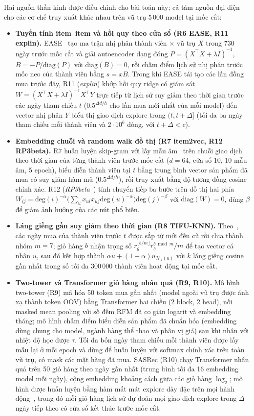 \documentclass[jtehm]{ieeeaccess}
\begin{document}
Hai nguồn thần kinh được điều chỉnh cho bài toán này; cả tám nguồn đại diện cho các cơ chế truy xuất khác nhau trên vũ trụ 5\,000 model tại mốc cắt:
\begin{itemize}
\item \textbf{Tuyến tính item--item và hồi quy theo cửa sổ (R6 EASE, R11 explin).} EASE~\cite{steck2019ease} tạo ma trận nhị phân thành viên $\times$ vũ trụ $X$ trong 730 ngày trước mốc cắt và giải autoencoder dạng đóng $P = (X^\top X + \lambda I)^{-1}$, $B = -P / \mathrm{diag}(P)$ với $\mathrm{diag}(B) = 0$, rồi chấm điểm lịch sử nhị phân trước mốc neo của thành viên bằng $s = xB$. Trong khi EASE tái tạo các lần đồng mua trước đây, R11 (\emph{explin}) khớp hồi quy ridge có giám sát $W = (X^\top X + \lambda I)^{-1} X^\top Y$ trực tiếp từ lịch sử suy giảm theo thời gian trước các ngày tham chiếu $t$ ($0.5^{\Delta d / h}$ cho lần mua mới nhất của mỗi model) đến vector nhị phân $Y$ biểu thị giao dịch explore trong $(t, t+\Delta]$ (tối đa ba ngày tham chiếu mỗi thành viên và $2\cdot 10^6$ dòng, với $t+\Delta < c$).
\item \textbf{Embedding chuỗi và random walk đồ thị (R7 item2vec, R12 RP3beta).} R7 huấn luyện skip-gram với lấy mẫu âm~\cite{barkan2016item2vec} trên chuỗi giao dịch theo thời gian của từng thành viên trước mốc cắt ($d=64$, cửa sổ 10, 10 mẫu âm, 5 epoch), biểu diễn thành viên tại $t$ bằng trung bình vector sản phẩm đã mua có suy giảm hàm mũ ($0.5^{\Delta d / h}$), rồi truy xuất bằng độ tương đồng cosine chính xác. R12 (\emph{RP3beta}~\cite{paudel2017rp3beta}) tính chuyển tiếp ba bước trên đồ thị hai phía $W_{ij} = \mathrm{deg}(i)^{-\alpha}\bigl(\sum_u x_{ui}x_{uj}\mathrm{deg}(u)^{-\alpha}\bigr)\mathrm{deg}(j)^{-\beta}$ với $\mathrm{diag}(W)=0$, dùng $\beta$ để giảm ảnh hưởng của các nút phổ biến.
\item \textbf{Láng giềng gần suy giảm theo thời gian (R8 TIFU-KNN).} Theo~\cite{hu2020tifu}, các ngày mua của thành viên trước $t$ được sắp từ mới đến cũ rồi chia thành nhóm $m=7$; giỏ hàng $b$ nhận trọng số $r_g^{\lfloor b/m \rfloor} r_b^{b \bmod m} / m$ để tạo vector cá nhân $u$, sau đó kết hợp thành $\alpha u + (1-\alpha)\bar{u}_{\mathcal{N}_k(u)}$ với $k$ láng giềng cosine gần nhất trong số tối đa 300\,000 thành viên hoạt động tại mốc cắt.
\item \textbf{Two-tower và Transformer giỏ hàng nhân quả (R9, R10).} Mô hình two-tower (R9) mã hóa 50 token mua gần nhất (model ngoài vũ trụ được ánh xạ thành token OOV) bằng Transformer hai chiều (2 block, 2 head), nối masked mean pooling với số đếm RFM đã co giãn logarit và embedding tháng; mô hình chấm điểm biểu diễn sản phẩm đã chuẩn hóa (embedding dùng chung cho model, ngành hàng thể thao và phân vị giá) sau khi nhân với nhiệt độ học được $\tau$. Tối đa bốn ngày tham chiếu mỗi thành viên được lấy mẫu lại ở mỗi epoch và dùng để huấn luyện với softmax chính xác trên toàn vũ trụ, có mask các mặt hàng đã mua. SASRec (R10) chạy Transformer nhân quả trên 50 giỏ hàng theo ngày gần nhất (trung bình tối đa 16 embedding model mỗi ngày), cộng embedding khoảng cách giữa các giỏ hàng $\log_2$; mô hình được huấn luyện bằng hàm mất mát explore dày đặc trên mọi hành động~\cite{pancha2022pinnerformer}, trong đó mỗi giỏ hàng lịch sử dự đoán mọi giao dịch explore trong $\Delta$ ngày tiếp theo có cửa sổ kết thúc trước mốc cắt.

\end{itemize}
\end{document}
